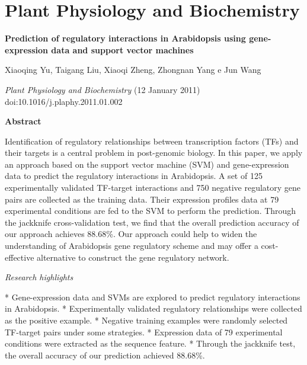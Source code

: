 \chapter{Plant Physiology and Biochemistry}


{\Large \bf Prediction of regulatory interactions in Arabidopsis using gene-expression data and support vector machines}

Xiaoqing Yu, Taigang Liu, Xiaoqi Zheng, Zhongnan Yang e Jun Wang

{\it Plant Physiology and Biochemistry} (12 January 2011) doi:10.1016/j.plaphy.2011.01.002

{\large \bf Abstract}

Identification of regulatory relationships between transcription factors (TFs) and their targets is a central problem in post-genomic biology. In this paper, we apply an approach based on the support vector machine (SVM) and gene-expression data to predict the regulatory interactions in Arabidopsis. A set of 125 experimentally validated TF-target interactions and 750 negative regulatory gene pairs are collected as the training data. Their expression profiles data at 79 experimental conditions are fed to the SVM to perform the prediction. Through the jackknife cross-validation test, we find that the overall prediction accuracy of our approach achieves 88.68\%. Our approach could help to widen the understanding of Arabidopsis gene regulatory scheme and may offer a cost-effective alternative to construct the gene regulatory network.

{\it Research highlights}

* Gene-expression data and SVMs are explored to predict regulatory interactions in Arabidopsis. * Experimentally validated regulatory relationships were collected as the positive example. * Negative training examples were randomly selected TF-target pairs under some strategies. * Expression data of 79 experimental conditions were extracted as the sequence feature. * Through the jackknife test, the overall accuracy of our prediction achieved 88.68\%.